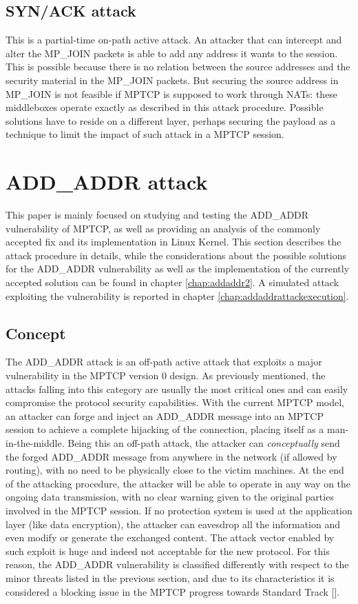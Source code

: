 \subsection{SYN/ACK attack}
This is a partial-time on-path active attack. An attacker that can intercept and alter the MP\_JOIN packets is able to add any address it wants to the session. This is possible because there is no relation between the source addresses and the security material in the MP\_JOIN packets. But securing the source address in MP\_JOIN is not feasible if MPTCP is supposed to work through NATs: these middleboxes operate exactly as described in this attack procedure. 
Possible solutions have to reside on a different layer, perhaps securing the payload as a technique to limit the impact of such attack in a MPTCP session.


\section{ADD\_ADDR attack} 
\label{theaddaddrattack}
This paper is mainly focused on studying and testing the ADD\_ADDR vulnerability of MPTCP, as well as providing an analysis of the commonly accepted fix and its implementation in Linux Kernel. This section describes the attack procedure in details, while the considerations about the possible solutions for the ADD\_ADDR vulnerability as well as the implementation of the currently accepted solution can be found in chapter \ref{chap:addaddr2}. A simulated attack exploiting the vulnerability is reported in chapter \ref{chap:addaddrattackexecution}.

\subsection{Concept}
The ADD\_ADDR attack is an off-path active attack that exploits a major vulnerability in the MPTCP version 0 design. As previously mentioned, the attacks falling into this category are usually the most critical ones and can easily compromise the protocol security capabilities.
With the current MPTCP model, an attacker can forge and inject an ADD\_ADDR message into an MPTCP session to achieve a complete hijacking of the connection, placing itself as a man-in-the-middle. Being this an off-path attack, the attacker can \textit{conceptually} send the forged ADD\_ADDR message from anywhere in the network (if allowed by routing), with no need to be physically close to the victim machines. At the end of the attacking procedure, the attacker will be able to operate in any way on the ongoing data transmission, with no clear warning given to the original parties involved in the MPTCP session.
If no protection system is used at the application layer (like data encryption), the attacker can eavesdrop all the information and even modify or generate the exchanged content. The attack vector enabled by such exploit is huge and indeed not acceptable for the new protocol. For this reason, the ADD\_ADDR vulnerability is classified differently with respect to the minor threats listed in the previous section, and due to its characteristics it is considered a blocking issue in the MPTCP progress towards Standard Track [].


